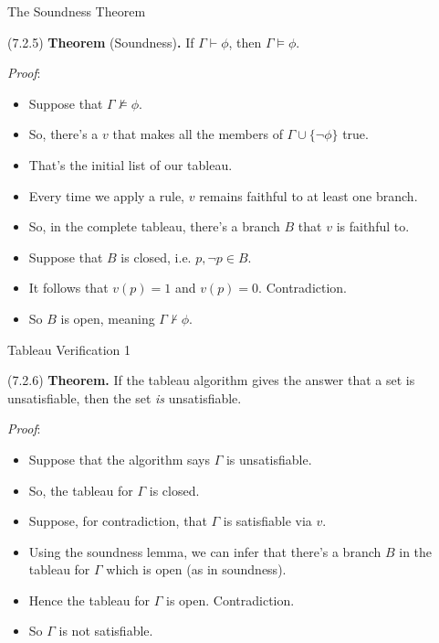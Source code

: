 \documentclass[../slides.tex]{subfiles}
\begin{document}
\begin{frame}{The Soundness Theorem}

(7.2.5) \textbf{Theorem} (Soundness)\textbf{.} If $\Gamma\vdash\phi$, then $\Gamma\vDash\phi$.


	\emph{Proof}:

	\begin{itemize}
	
		\item Suppose that $\Gamma\nvDash\phi$.
		
		\item So, there's a $v$ that makes all the members of $\Gamma\cup\{\neg\phi\}$ true.
		
		\item That's the initial list of our tableau.
		
		\item Every time we apply a rule, $v$ remains faithful to at least one branch.
		
		\item So, in the complete tableau, there's a branch $B$ that $v$ is faithful to.
		
		\item Suppose that $B$ is closed, i.e. $p,\neg p\in B$. 
		
		\item It follows that $v(p)=1$ and $v(p)=0$. Contradiction.
		
		\item So $B$ is open, meaning $\Gamma\nvdash\phi$.
	
	\end{itemize}

\end{frame}

\begin{frame}{Tableau Verification 1}

	(7.2.6) \textbf{Theorem.} If the tableau algorithm gives the answer that a set is unsatisfiable, then the set \emph{is} unsatisfiable. 

	\emph{Proof}:
	
	\begin{itemize}
	
		\item Suppose that the algorithm says $\Gamma$ is unsatisfiable.
		
		\item So, the tableau for $\Gamma$ is closed.
		
		\item Suppose, for contradiction, that $\Gamma$ is satisfiable via $v$.
		
		\item Using the soundness lemma, we can infer that there's a branch $B$ in the tableau for $\Gamma$ which is open (as in soundness). 
	
		\item Hence the tableau for $\Gamma$ is open. Contradiction.
		
		\item So $\Gamma$ is not satisfiable.
	
	\end{itemize}

\end{frame}
\end{document}
